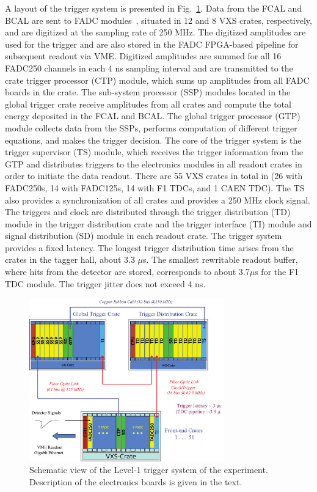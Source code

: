 A layout of the trigger system is presented in Fig.~\ref{fig:trig}. Data from the FCAL and BCAL are sent to  FADC modules~\cite{Dong:2007}, situated in 12 and 8 VXS crates, respectively, and are digitized at the sampling rate of 250 MHz. The digitized amplitudes are used for the trigger and are also stored in the FADC FPGA-based pipeline for subsequent readout via VME.
Digitized amplitudes are summed for all 16 FADC250 channels in each 4 ns sampling interval and are transmitted to the crate trigger processor (CTP) module, which sums up amplitudes from all FADC boards in the crate. The sub-system processor (SSP) modules located in the global trigger crate receive amplitudes from all crates and compute the total energy deposited in the FCAL and BCAL. The global trigger processor (GTP) module collects data from the SSPs, performs computation of different trigger equations, and makes the trigger decision. The core of the trigger system is the trigger supervisor (TS) module, which receives the trigger information from the GTP and distributes triggers to the electronics modules in all readout 
crates in order to initiate the data readout. There are 55 VXS crates in total in \gx{} (26 with FADC250s, 14 with  FADC125s, 14 with F1 TDCs, and 1 CAEN TDC). The TS also provides a synchronization of all crates and provides a 250 MHz clock signal. The triggers and clock are distributed through the trigger distribution (TD) module in the trigger distribution crate and the trigger interface (TI) module and signal distribution (SD) module in each readout crate. The \gx{} trigger system provides a fixed latency. The longest trigger distribution time arises from the crates in the tagger hall, about 3.3 $\mu$s. 
The smallest rewritable readout buffer, where hits from the detector are stored, corresponds to about 3.7$\mu$s for the F1 TDC module. The trigger jitter does not exceed 4 ns.


\begin{figure}[tbp]
\begin{center}
\includegraphics[width=0.75\textwidth]{figures/125_Somov-f1.pdf}  
\caption{Schematic view of the Level-1 trigger system of the \gx{} experiment. Description of the electronics boards is given in the text.} \label{fig:trig}
\end{center}
\end{figure}

